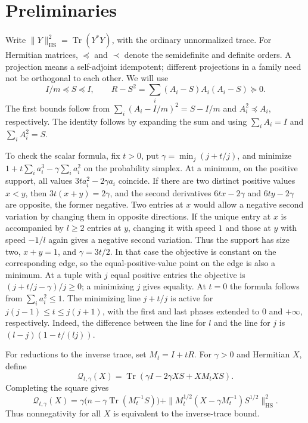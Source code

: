\documentclass[11pt]{article}
\newcommand{\Tr}{\operatorname{Tr}}
\newcommand{\HS}{\mathrm{HS}}
\begin{document}
\section{Preliminaries}\label{sec:prelim}

Write \(\|Y\|_{\HS}^2=\Tr(Y^*Y)\), with the ordinary unnormalized trace.
For Hermitian matrices, \(\preceq\) and \(\prec\) denote the semidefinite
and definite orders. A projection means a self-adjoint idempotent;
different projections in a family need not be orthogonal to each other.
We will use
\begin{equation}\label{eq:moments}
 I/m\preceq S\preceq I,\qquad
 R-S^2=\sum_i(A_i-S)A_i(A_i-S)\succeq0.
\end{equation}
The first bounds follow from \(\sum_i(A_i-I/m)^2=S-I/m\) and
\(A_i^2\preceq A_i\), respectively. The identity follows by expanding
the sum and using \(\sum_i A_i=I\) and \(\sum_i A_i^2=S\).

To check the scalar formula, fix \(t>0\), put \(\gamma=\min_j(j+t/j)\),
and minimize \(1+t\sum_i a_i^3-\gamma\sum_i a_i^2\) on the probability
simplex. At a minimum, on the positive support, all values
\(3ta_i^2-2\gamma a_i\) coincide. If there are two distinct positive
values \(x<y\), then \(3t(x+y)=2\gamma\), and the second derivatives
\(6tx-2\gamma\) and \(6ty-2\gamma\) are opposite, the former negative.
Two entries at \(x\) would allow a negative second variation by changing
them in opposite directions. If the unique entry at \(x\) is accompanied
by \(l\ge2\) entries at \(y\), changing it with speed \(1\) and those at
\(y\) with speed \(-1/l\) again gives a negative second variation.
Thus the support has size two, \(x+y=1\), and \(\gamma=3t/2\). In
that case the objective is constant on the corresponding edge, so
the equal-positive-value point on the edge is also a minimum.
At a tuple with \(j\) equal positive entries the objective is
\((j+t/j-\gamma)/j\ge0\); a minimizing \(j\) gives equality. At
\(t=0\) the formula follows from \(\sum_i a_i^2\le1\).
The minimizing line \(j+t/j\) is active for
\(j(j-1)\le t\le j(j+1)\), with the first and last phases extended to
\(0\) and \(+\infty\), respectively. Indeed, the difference between the
line for \(l\) and the line for \(j\) is
\((l-j)(1-t/(lj))\).

For reductions to the inverse trace, set \(M_t=I+tR\).
For \(\gamma>0\) and Hermitian \(X\), define
\[
\mathcal Q_{t,\gamma}(X)=
\Tr(\gamma I-2\gamma XS+XM_tXS).
\]
Completing the square gives
\begin{equation}\label{eq:completion}
\mathcal Q_{t,\gamma}(X)
=\gamma\big(n-\gamma\Tr(M_t^{-1}S)\big)
+\|M_t^{1/2}(X-\gamma M_t^{-1})S^{1/2}\|_{\HS}^2.
\end{equation}
Thus nonnegativity for all \(X\) is equivalent to the inverse-trace
bound.
\end{document}

